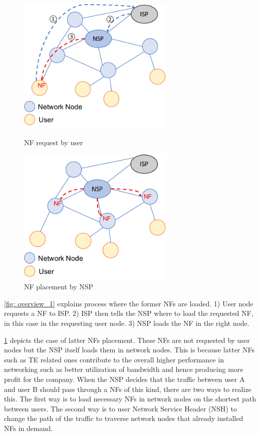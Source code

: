 \begin{figure}[htbp]
	\begin{minipage}{0.5\hsize}
		\begin{center}
			\includegraphics[width=75mm]{pics/overview_1.pdf}
		\end{center}
		\caption{NF request by user}
		\label{fig: overview_1}
	\end{minipage}	
	\begin{minipage}{0.5\hsize}
		\begin{center}
			\includegraphics[width=75mm]{pics/overview_2.pdf}
		\end{center}
		\caption{NF placement by NSP}
		\label{fig: overview_2}
	\end{minipage}	
\end{figure}

\ref{fig: overview_1} explains process where the former NFs are loaded. 1) User node requests a NF to ISP. 2) ISP then tells the NSP where to load the requested NF, in this case in the requesting user node. 3) NSP loads the NF in the right node. 

\ref{fig: overview_2} depicts the case of latter NFs placement. These NFs are not requested by user nodes but the NSP itself loads them in network nodes. This is because latter NFs such as TE related ones contribute to the overall higher performance in networking such as better utilization of bandwidth and hence producing more profit for the company. When the NSP decides that the traffic between user A and user B should pass through a NFs of this kind, there are two ways to realize this. The first way is to load necessary NFs in network nodes on the shortest path between users. The second way is to user Network Service Header (NSH) to change the path of the traffic to traverse network nodes that already installed NFs in demand. 


